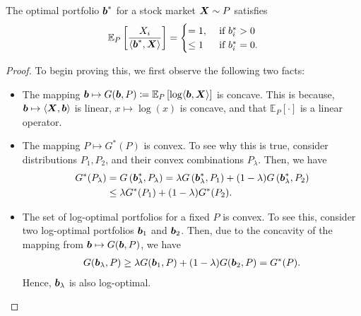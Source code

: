     \begin{theorem}
        \label{thm:optimal-stock-portfolio-1} The optimal portfolio $\boldsymbol{b}^*$ for a stock market $\boldsymbol{X} \sim P$ satisfies 
        \begin{align}
            \mathbb{E}_P\left[ \frac{X_i}{\langle \boldsymbol{b}^*, \boldsymbol{X} \rangle} \right] = 
            \begin{cases}
                = 1, & \text{ if } b_i^* > 0 \\
                \leq 1 & \text{ if } b_i^* = 0. 
            \end{cases}
        \end{align}
    \end{theorem}
    \begin{proof}
        To begin proving this, we first observe the following two facts: 
        \begin{itemize}
            \item The mapping $\boldsymbol{b} \mapsto G(\boldsymbol{b}, P) \coloneqq \mathbb{E}_P\left[ \log \langle \boldsymbol{b}, \boldsymbol{X} \rangle \right]$ is concave. This is because, $\boldsymbol{b} \mapsto \langle \boldsymbol{X}, \boldsymbol{b} \rangle$ is linear, $x \mapsto \log(x)$ is concave, and that $\mathbb{E}_P[\cdot]$ is a linear operator. 
            \item The mapping $P \mapsto G^*(P)$ is convex. To see why this is true, consider distributions $P_1, P_2$, and their convex combinations $P_\lambda$. Then, we have 
            \begin{align}
                G^*(P_\lambda) &= G\left( \boldsymbol{b}^*_\lambda, P_\lambda \right) = \lambda G\left( \boldsymbol{b}^*_\lambda, P_1 \right) + (1-\lambda) G\left( \boldsymbol{b}^*_\lambda, P_2 \right)  \\
                & \leq \lambda G^*(P_1) + (1-\lambda)G^*(P_2). 
            \end{align}
            \item The set of log-optimal portfolios for a fixed $P$ is convex. To see this, consider two log-optimal portfolios $\boldsymbol{b}_1$ and $\boldsymbol{b}_2$. Then, due to the concavity of the mapping from $\boldsymbol{b} \mapsto G(\boldsymbol{b}, P)$, we have 
            \begin{align}
                G(\boldsymbol{b}_\lambda, P) \geq \lambda G(\boldsymbol{b}_1, P) + (1-\lambda) G(\boldsymbol{b}_2, P) = G^*(P). 
            \end{align}
            Hence, $\boldsymbol{b}_\lambda$ is also log-optimal. 
        \end{itemize}


\end{proof}
